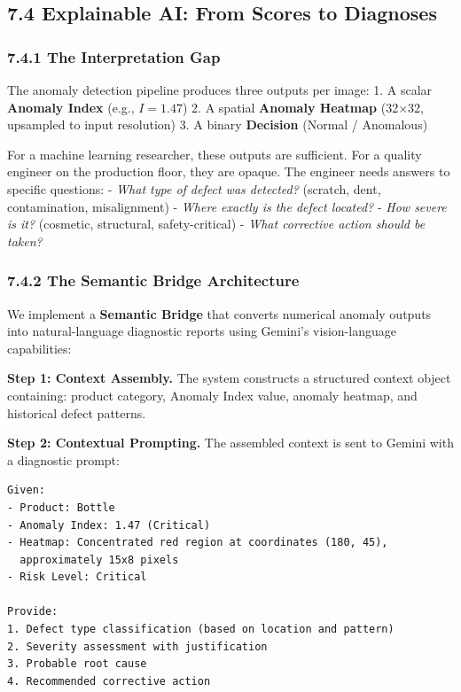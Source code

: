 \documentclass[12pt, a4paper, oneside]{report}
\begin{document}
\bigskip\noindent\hrulefill\bigskip

\subsection{7.4 Explainable AI: From Scores to Diagnoses}\label{explainable-ai-from-scores-to-diagnoses}

\subsubsection{7.4.1 The Interpretation Gap}\label{the-interpretation-gap}

The anomaly detection pipeline produces three outputs per image: 1. A scalar \textbf{Anomaly Index} (e.g., \(I = 1.47\)) 2. A spatial \textbf{Anomaly Heatmap} (32$\times$32, upsampled to input resolution) 3. A binary \textbf{Decision} (Normal / Anomalous)

For a machine learning researcher, these outputs are sufficient. For a quality engineer on the production floor, they are opaque. The engineer needs answers to specific questions: - \emph{What type of defect was detected?} (scratch, dent, contamination, misalignment) - \emph{Where exactly is the defect located?} - \emph{How severe is it?} (cosmetic, structural, safety-critical) - \emph{What corrective action should be taken?}

\subsubsection{7.4.2 The Semantic Bridge Architecture}\label{the-semantic-bridge-architecture}

We implement a \textbf{Semantic Bridge} that converts numerical anomaly outputs into natural-language diagnostic reports using Gemini's vision-language capabilities:

\textbf{Step 1: Context Assembly.} The system constructs a structured context object containing: product category, Anomaly Index value, anomaly heatmap, and historical defect patterns.

\textbf{Step 2: Contextual Prompting.} The assembled context is sent to Gemini with a diagnostic prompt:

\begin{lstlisting}
Given:
- Product: Bottle
- Anomaly Index: 1.47 (Critical)
- Heatmap: Concentrated red region at coordinates (180, 45),
  approximately 15x8 pixels
- Risk Level: Critical

Provide:
1. Defect type classification (based on location and pattern)
2. Severity assessment with justification
3. Probable root cause
4. Recommended corrective action
\end{lstlisting}
\end{document}
